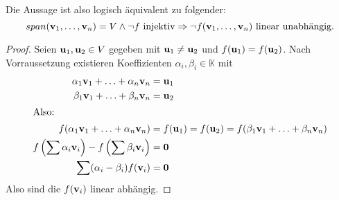 \documentclass{../mfa}
\begin{document}
Die Aussage ist also logisch äquivalent zu folgender:
\begin{equation*}
   span(\mathbf{v}_{1}, \ldots, \mathbf{v}_{n}) = V \wedge \neg f~\text{injektiv} \Rightarrow \neg
   f(\mathbf{v}_{1}, \ldots, \mathbf{v}_{n}) ~\text{linear unabhängig.}
\end{equation*}

\begin{proof}
Seien $\mathbf{u}_1, \mathbf{u}_2 \in V$ gegeben mit $\mathbf{u}_1 \neq \mathbf{u}_2$ und
$f(\mathbf{u}_1) =
f(\mathbf{u}_2)$. Nach Vorraussetzung existieren Koeffizienten $\alpha_i, \beta_i \in
\mathbb{K}$ mit 
\begin{align*}
   \alpha_1 \mathbf{v}_{1} + \ldots + \alpha_n \mathbf{v}_{n} &= \mathbf{u}_1 \\
   \beta_1 \mathbf{v}_{1} + \ldots + \beta_n \mathbf{v}_{n} &= \mathbf{u}_2 \\
   \intertext{Also:}
   f(\alpha_1 \mathbf{v}_{1} + \ldots + \alpha_n \mathbf{v}_{n}) &= f(\mathbf{u}_1) = f(\mathbf{u}_2) =
   f(\beta_1 \mathbf{v}_{1} + \ldots + \beta_n \mathbf{v}_{n}) \\
   f\left(\sum \alpha_i \mathbf{v}_{i}\right) - f\left(\sum \beta_i \mathbf{v}_{i}\right) &= \mathbf{0} \\
   \sum (\alpha_i - \beta_i)f(\mathbf{v}_{i}) &= \mathbf{0}
\end{align*}
Also sind die $f(\mathbf{v}_{i})$ linear abhängig.
\end{proof}
\end{document}
